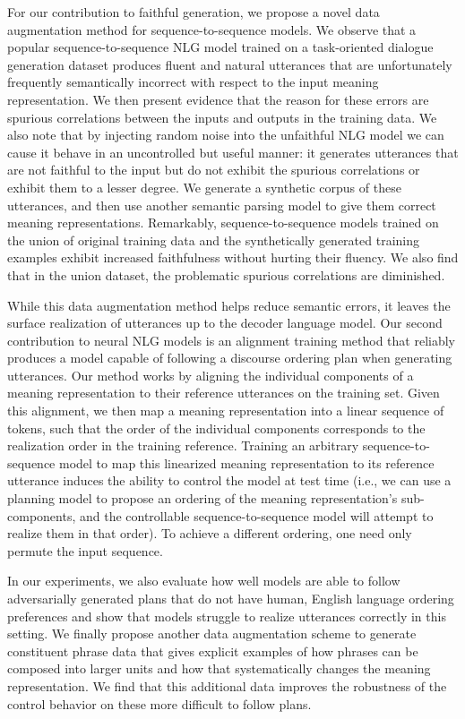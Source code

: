 For our contribution to faithful generation, we propose a novel data
augmentation method for sequence-to-sequence models.  We observe that a popular
sequence-to-sequence NLG model trained on a task-oriented dialogue generation
dataset produces fluent and natural utterances that are unfortunately
frequently semantically incorrect with respect to the input meaning
representation.  We then present evidence that the reason for these errors are
spurious correlations between the inputs and outputs in the training data.  We
also note that by injecting random noise into the unfaithful NLG model we can
cause it behave in an uncontrolled but useful manner: it generates utterances
that are not faithful to the input but do not exhibit the spurious correlations
or exhibit them to a lesser degree.  We generate a synthetic corpus of these
utterances, and then use another semantic parsing model to give them correct
meaning representations.  Remarkably, sequence-to-sequence models trained on
the union of original training data and the synthetically generated training
examples exhibit increased faithfulness without hurting their fluency. We also
find that in the union dataset, the problematic spurious correlations are
diminished.

While this data augmentation method helps reduce semantic errors, it leaves the
surface realization of utterances up to the decoder language model.  Our second
contribution to neural NLG models is an alignment training method that reliably
produces a model capable of following a discourse ordering plan when generating
utterances.  Our method works by aligning the individual components of a
meaning representation to their reference utterances on the training set. Given
this alignment, we then map a meaning representation into a linear sequence of
tokens, such that the order of the individual components corresponds to the
realization order in the training reference. Training an arbitrary
sequence-to-sequence model to map this linearized meaning representation to its
reference utterance induces the ability to control the model at test time
(i.e., we can use a planning model to propose an ordering of the meaning
representation's sub-components, and the controllable sequence-to-sequence
model will attempt to realize them in that order).  To achieve a different
ordering, one need only permute the input sequence.

In our experiments, we also evaluate how well models are able to follow
adversarially generated plans that do not have human, English language ordering
preferences and show that models struggle to realize utterances correctly in
this setting. We finally propose another data augmentation scheme to generate
constituent phrase data that gives explicit examples of how phrases can be
composed into larger units and how that systematically changes the meaning
representation. We find that this additional data improves the robustness of
the control behavior on these more difficult to follow plans.
